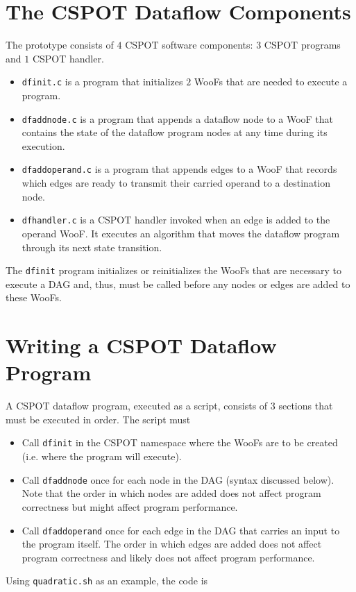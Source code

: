 \documentclass[10pt]{article}
\begin{document}
\section{The CSPOT Dataflow Components}

The prototype consists of $4$ CSPOT software components: $3$ CSPOT programs 
and $1$ CSPOT handler.
\begin{itemize}
\item \verb+dfinit.c+ is a program that initializes $2$ WooFs that are needed
to execute a program.
\item \verb+dfaddnode.c+ is a program that appends a dataflow node to a WooF
that contains the state of the dataflow program nodes at any time during its
execution.
\item \verb+dfaddoperand.c+ is a program that appends edges to a WooF that
records which edges are ready to transmit their carried operand to a
destination node.
\item \verb+dfhandler.c+ is a CSPOT handler invoked when an edge is added to
the operand WooF.  It executes an algorithm that moves the dataflow program
through its next state transition.
\end{itemize}
The \verb+dfinit+ program initializes or reinitializes the WooFs that are
necessary to execute a DAG and, thus, must be called before any nodes or edges
are added to these WooFs.  

\section{Writing a CSPOT Dataflow Program}

A CSPOT dataflow program, executed as a script, consists of $3$ sections that
must be executed in order.  The script must
\begin{itemize}
\item Call \verb+dfinit+ in the CSPOT namespace where the WooFs are to be
created (i.e. where the program will execute).
\item Call \verb+dfaddnode+ once for each node in the DAG (syntax discussed
below).  Note that the order in which nodes are added does not affect program
correctness but might affect program performance.
\item Call \verb+dfaddoperand+ once for each edge in the DAG that carries an
input to the program itself. The order in which edges are added does not
affect program correctness and likely does not affect program performance.
\end{itemize}
Using \verb+quadratic.sh+ as an example, the code is 
\end{document}
